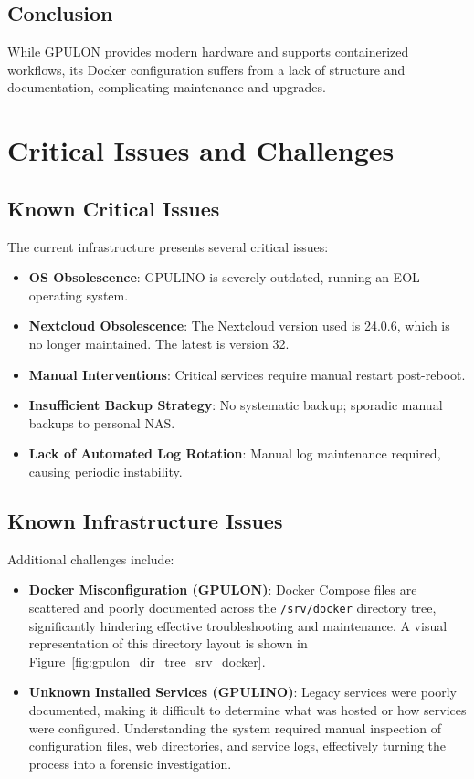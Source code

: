 \subsection{Conclusion}

While GPULON provides modern hardware and supports containerized workflows, its Docker configuration suffers from a lack of structure and documentation, complicating maintenance and upgrades.

\section{Critical Issues and Challenges}

\subsection{Known Critical Issues}

The current infrastructure presents several critical issues:
\begin{itemize}
  \item \textbf{OS Obsolescence}: GPULINO is severely outdated, running an EOL operating system.
  \item \textbf{Nextcloud Obsolescence}: The Nextcloud version used is 24.0.6, which is no longer maintained. The latest is version 32.
  \item \textbf{Manual Interventions}: Critical services require manual restart post-reboot.
  \item \textbf{Insufficient Backup Strategy}: No systematic backup; sporadic manual backups to personal NAS.
  \item \textbf{Lack of Automated Log Rotation}: Manual log maintenance required, causing periodic instability.
\end{itemize}

\subsection{Known Infrastructure Issues}

Additional challenges include:
\begin{itemize}
  \item \textbf{Docker Misconfiguration (GPULON)}: Docker Compose files are scattered and poorly documented across the \texttt{/srv/docker} directory tree, significantly hindering effective troubleshooting and maintenance. A visual representation of this directory layout is shown in Figure~\ref{fig:gpulon_dir_tree_srv_docker}.
  \item \textbf{Unknown Installed Services (GPULINO)}: Legacy services were poorly documented, making it difficult to determine what was hosted or how services were configured. Understanding the system required manual inspection of configuration files, web directories, and service logs, effectively turning the process into a forensic investigation.
\end{itemize}

